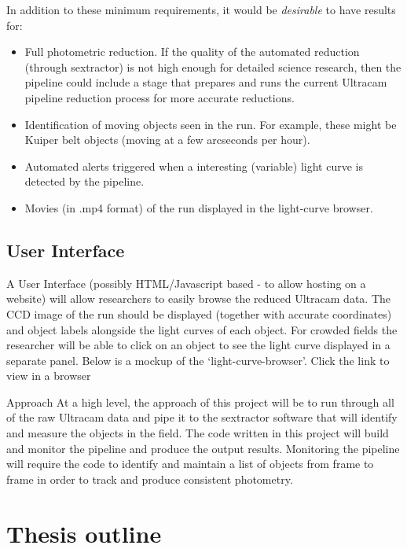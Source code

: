 \documentclass[a4paper,10pt]{article}
\begin{document}
In addition to these minimum requirements, it would be \emph{desirable} to have results for:

\begin{itemize}
	\item Full photometric reduction. If the quality of the automated reduction (through sextractor) is not high enough for detailed science research, then the pipeline could include a stage that prepares and runs the current Ultracam pipeline reduction process for more accurate reductions.
	\item Identification of moving objects seen in the run. For example, these might be Kuiper belt objects (moving at a few arcseconds per hour).
	\item Automated alerts triggered when a interesting (variable) light curve is detected by the pipeline. 
	\item Movies (in .mp4 format) of the run displayed in the light-curve browser. 
\end{itemize}

\subsection{User Interface}
A User Interface (possibly HTML/Javascript based - to allow hosting on a website) will allow researchers to easily browse the reduced Ultracam data. The CCD image of the run should be displayed (together with accurate coordinates) and object labels alongside the light curves of each object. For crowded fields the researcher will be able to click on an object to see the light curve displayed in a separate panel. Below is a mockup of the ‘light-curve-browser’.
Click the link to view in a browser


Approach
At a high level, the approach of this project will be to 
run through all of the raw Ultracam data and pipe it to the 
sextractor software that will identify and measure the objects in 
the field. The code written in this project will build and monitor 
the pipeline and produce the output results. Monitoring the pipeline 
will require the code to identify and maintain a list of objects 
from frame to frame in order to track and produce consistent 
photometry. 





\section{Thesis outline}
\end{document}
